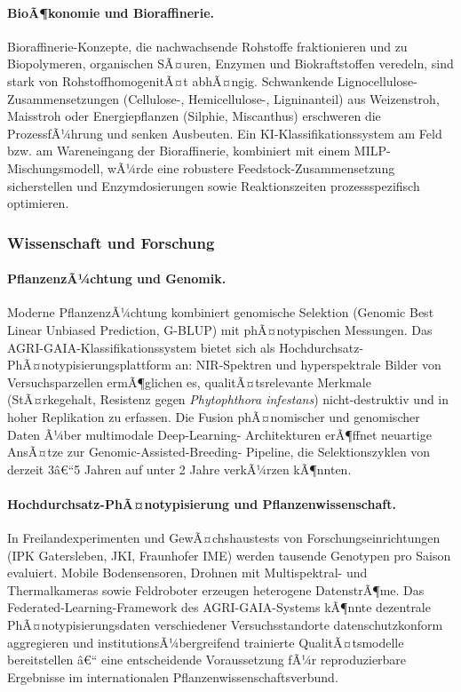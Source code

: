 ﻿\documentclass[12pt,a4paper]{article}
\theoremstyle{plain}
\theoremstyle{definition}
\begin{document}
	\paragraph{BioÃ¶konomie und Bioraffinerie.}
	Bioraffinerie-Konzepte, die nachwachsende Rohstoffe fraktionieren und
	zu Biopolymeren, organischen SÃ¤uren, Enzymen und Biokraftstoffen
	veredeln, sind stark von RohstoffhomogenitÃ¤t abhÃ¤ngig. Schwankende
	Lignocellulose-Zusammensetzungen (Cellulose-, Hemicellulose-,
	Ligninanteil) aus Weizenstroh, Maisstroh oder Energiepflanzen
	(Silphie, Miscanthus) erschweren die ProzessfÃ¼hrung und senken Ausbeuten.
	Ein KI-Klassifikationssystem am Feld bzw. am Wareneingang der Bioraffinerie,
	kombiniert mit einem MILP-Mischungsmodell, wÃ¼rde eine robustere
	Feedstock-Zusammensetzung sicherstellen und Enzymdosierungen sowie
	Reaktionszeiten prozessspezifisch optimieren.

	\subsubsection{Wissenschaft und Forschung}

	\paragraph{PflanzenzÃ¼chtung und Genomik.}
	Moderne PflanzenzÃ¼chtung kombiniert genomische Selektion
	(Genomic Best Linear Unbiased Prediction, G-BLUP) mit phÃ¤notypischen
	Messungen. Das AGRI-GAIA-Klassifikationssystem bietet sich als
	Hochdurchsatz-PhÃ¤notypisierungsplattform an: NIR-Spektren und
	hyperspektrale Bilder von Versuchsparzellen ermÃ¶glichen es, qualitÃ¤tsrelevante
	Merkmale (StÃ¤rkegehalt, Resistenz gegen \textit{Phytophthora infestans})
	nicht-destruktiv und in hoher Replikation zu erfassen. Die Fusion
	phÃ¤nomischer und genomischer Daten Ã¼ber multimodale Deep-Learning-
	Architekturen erÃ¶ffnet neuartige AnsÃ¤tze zur Genomic-Assisted-Breeding-
	Pipeline, die Selektionszyklen von derzeit 3â€“5 Jahren auf unter 2 Jahre
	verkÃ¼rzen kÃ¶nnten.

	\paragraph{Hochdurchsatz-PhÃ¤notypisierung und Pflanzenwissenschaft.}
	In Freilandexperimenten und GewÃ¤chshaustests von Forschungseinrichtungen
	(IPK Gatersleben, JKI, Fraunhofer IME) werden tausende Genotypen pro
	Saison evaluiert. Mobile Bodensensoren, Drohnen mit Multispektral- und
	Thermalkameras sowie Feldroboter erzeugen heterogene DatenstrÃ¶me.
	Das Federated-Learning-Framework des AGRI-GAIA-Systems kÃ¶nnte dezentrale
	PhÃ¤notypisierungsdaten verschiedener Versuchsstandorte datenschutzkonform
	aggregieren und institutionsÃ¼bergreifend trainierte QualitÃ¤tsmodelle
	bereitstellen â€“ eine entscheidende Voraussetzung fÃ¼r reproduzierbare
	Ergebnisse im internationalen Pflanzenwissenschaftsverbund.
\end{document}
